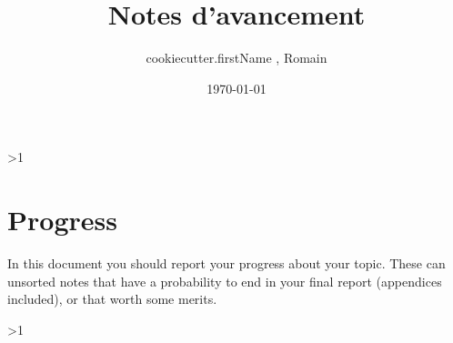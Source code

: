 \documentclass[a4paper]{article}  %
\title{Notes d'avancement}
\author{ {{cookiecutter.firstName}} \famName{ {{cookiecutter.familyName}} }, Romain \famName{Noël} }
\date{\today}
\newcommand{\Pathbasebib}{\PathR/ref_RN.bib,\PathR/ref_XX.bib}%
\begin{document}

\ifnum\value{levelstanda}>1
	{}%
\else
	\maketitle
\fi


\section{Progress}
	In this document you should report your progress about your topic.
	These can unsorted notes that have a probability to end in your final report (appendices included), or that worth some merits.


\ifnum\value{levelstanda}>1
	{}%
\else

	\printunsrtglossary[type=acronym]
	\printunsrtglossary[type=symbol]
\fi

\addtocounter{levelstanda}{-1}
\end{document}
